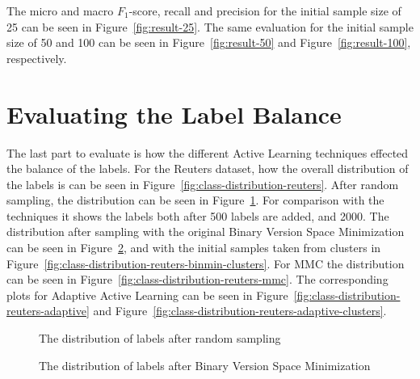 The micro and macro $F_1$-score, recall and precision for the initial sample size of 25 can be seen in Figure~\ref{fig:result-25}.
The same evaluation for the initial sample size of 50 and 100 can be seen in Figure~\ref{fig:result-50} and Figure~\ref{fig:result-100}, respectively.


\section{Evaluating the Label Balance}

The last part to evaluate is how the different Active Learning techniques effected the balance of the labels.
For the Reuters dataset, how the overall distribution of the labels is can be seen in Figure~\ref{fig:class-distribution-reuters}.
After random sampling, the distribution can be seen in Figure~\ref{fig:class-distribution-reuters-random}.
For comparison with the techniques it shows the labels both after 500 labels are added, and 2000.
The distribution after sampling with the original Binary Version Space Minimization can be seen in Figure~\ref{fig:class-distribution-reuters-binmin}, and with the initial samples taken from clusters in Figure~\ref{fig:class-distribution-reuters-binmin-clusters}.
For MMC the distribution can be seen in Figure~\ref{fig:class-distribution-reuters-mmc}.
The corresponding plots for Adaptive Active Learning can be seen in Figure~\ref{fig:class-distribution-reuters-adaptive} and Figure~\ref{fig:class-distribution-reuters-adaptive-clusters}.

\begin{figure}
    \centering
    \caption{The distribution of labels after random sampling}
    \label{fig:class-distribution-reuters-random}
\end{figure}

\begin{figure}
    \centering
    \caption{The distribution of labels after Binary Version Space Minimization}
    \label{fig:class-distribution-reuters-binmin}
\end{figure}


